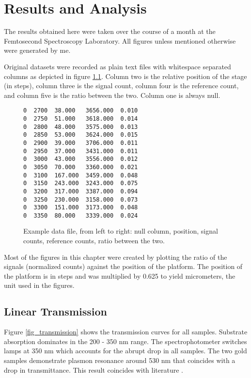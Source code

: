 \chapter{Results and Analysis}\label{chap_results}
\minitoc

The results obtained here were taken over the course of a month at the Femtosecond Spectroscopy Laboratory. All figures unless mentioned otherwise were generated by me.

Original datasets were recorded as plain text files with whitespace separated columns as depicted in figure \ref{fig_datafile}. Column two is the relative position of the stage (in steps), column three is the signal count, column four is the reference count, and column five is the ratio between the two. Column one is always null.

\begin{figure}[h]
\begin{Verbatim}[frame=single,fontfamily=courier,fontsize=\small]
0  2700  38.000   3656.000  0.010
0  2750  51.000   3618.000  0.014
0  2800  48.000   3575.000  0.013
0  2850  53.000   3624.000  0.015
0  2900  39.000   3706.000  0.011
0  2950  37.000   3431.000  0.011
0  3000  43.000   3556.000  0.012
0  3050  70.000   3360.000  0.021
0  3100  167.000  3459.000  0.048
0  3150  243.000  3243.000  0.075
0  3200  317.000  3387.000  0.094
0  3250  230.000  3158.000  0.073
0  3300  151.000  3173.000  0.048
0  3350  80.000   3339.000  0.024
\end{Verbatim}
\caption[Example data file.]{Example data file, from left to right: null column, position, signal counts, reference counts, ratio between the two.\label{fig_datafile}}
\end{figure}

Most of the figures in this chapter were created by plotting the ratio of the signals (normalized counts) against the position of the platform. The position of the platform is in steps and was multiplied by 0.625 to yield micrometers, the unit used in the figures. 

\section{Linear Transmission}
Figure \ref{fig_transmission} shows the transmission curves for all samples. Substrate absorption dominates in the 200 - 350 nm range. The spectrophotometer switches lamps at 350 nm which accounts for the abrupt drop in all samples. The two gold samples demonstrate plasmon resonance around 530 nm that coincides with a drop in transmittance. This result coincides with literature \cite{schaadt2005enhanced, lin2005one}.

